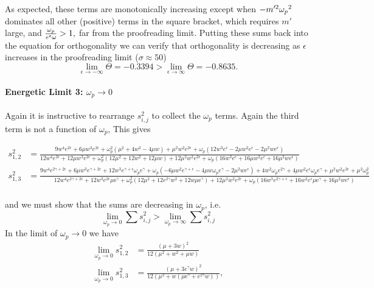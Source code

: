 As expected, these terms are monotonically increasing except when $-m'^2{\omega_p}^2$ dominates all other (positive) terms in the square bracket, which requires $m'$ large, and $\frac{{\omega_p}}{e^\epsilon \omega}> 1,$ far from the proofreading limit.
Putting these sums back into the equation for orthogonality we can verify that orthogonality is decreasing as $\epsilon$ increases in the proofreading limit ($\sigma\approx50$)
\[
\lim_{\epsilon\to-\infty}\Theta=-0.3394>\lim_{\epsilon\to\infty}\Theta=-0.8635.
\]

\paragraph{Energetic Limit 3: $\omega_p\to0$}
Again it is instructive to rearrange $s^2_{i,j}$ to collect the $\omega_p$ terms.  Again the third term is not a function of $\omega_p$, This gives
\begin{widetext}
\begin{eqnarray*}
s^2_{1,2}&=\frac{9 w^4 e^{2 \epsilon }+6 \mu  w^3 e^{2 \epsilon }+\omega_p^2 \left(\mu ^2+4 w^2-4 \mu  w\right)+\mu ^2 w^2 e^{2 \epsilon }+\omega_p \left(12 w^3 e^{\epsilon }-2 \mu  w^2 e^{\epsilon }-2 \mu ^2 w e^{\epsilon }\right)}{12 w^4 e^{2 \epsilon }+12 \mu  w^3 e^{2 \epsilon }+\omega_p^2 \left(12 \mu ^2+12 w^2+12 \mu  w\right)+12 \mu ^2 w^2 e^{2 \epsilon }+\omega_p \left(16 w^3 e^{\epsilon }+16 \mu  w^2 e^{\epsilon }+16 \mu ^2 w e^{\epsilon }\right)}\\
s^2_{1,3}&=\frac{9 w^4 e^{2 \gamma +2 \epsilon }+6 \mu  w^3 e^{\gamma +2 \epsilon }+12 w^3 e^{\gamma +\epsilon }\omega_p e^{\gamma }+\omega_p \left(-6 \mu  w^2 e^{\gamma +\epsilon }-4 \mu  w\omega_p e^{\gamma }-2 \mu ^2 w e^{\epsilon }\right)+4 w^2\omega_p e^{2 \gamma }+4 \mu  w^2 e^{\epsilon }\omega_p e^{\gamma }+\mu ^2 w^2 e^{2 \epsilon }+\mu ^2 \omega_p^2}{12 w^4 e^{2 \gamma +2 \epsilon }+12 w^3 e^{2 \epsilon } \text{$\mu $e}^{\gamma }+\omega_p^2 \left(12 \mu ^2+12 e^{2 \gamma } w^2+12 w \text{$\mu $e}^{\gamma }\right)+12 \mu ^2 w^2 e^{2 \epsilon }+\omega_p \left(16 w^3 e^{2 \gamma +\epsilon }+16 w^2 e^{\epsilon } \text{$\mu $e}^{\gamma }+16 \mu ^2 w e^{\epsilon }\right)}\\
\end{eqnarray*}
\end{widetext}
and we must show that the sums are decreasing in $\omega_p$, i.e.
\[
\lim_{\omega_p\to0}\sum{s^2_{i,j}}>\lim_{\omega_p\to\infty}\sum{s^2_{i,j}}
\]
In the limit of $\omega_p\to0$ we have %
\begin{eqnarray*}
\lim_{\omega_p\to0}{s^2_{1,2}}&=\frac{(\mu +3 w)^2}{12 \left(\mu ^2+w^2+\mu  w\right)}\\
\lim_{\omega_p\to0}{s^2_{1,3}}&=\frac{\left(\mu +3 e^{\gamma } w\right)^2}{12 \left(\mu ^2+w \left(\text{$\mu $e}^{\gamma }+e^{2 \gamma } w\right)\right)},\\
\end{eqnarray*}
